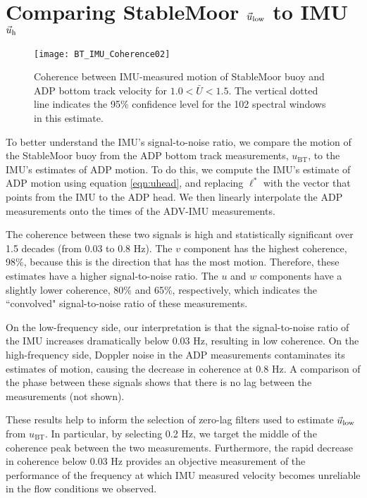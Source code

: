\section{Comparing StableMoor $\vec{u}_\mathrm{low}$ to IMU $\vec{u}_\mathrm{h}$}
\label{apdx:ulow}

\def\ubt{\ensuremath{u_\mathrm{BT}}}

\begin{figure}[t]
  \centering
  \texttt{[image: BT\_IMU\_Coherence02]}
  \caption{Coherence between IMU-measured motion of StableMoor buoy and ADP bottom track velocity for $1.0<\bar{U}<1.5$. The vertical dotted line indicates the 95\% confidence level for the 102 spectral windows in this estimate.}
  \label{fig:SM_coh}
\end{figure}
To better understand the IMU's signal-to-noise ratio, we compare the motion of the StableMoor buoy from the ADP bottom track measurements, $\ubt$, to the IMU's estimates of ADP motion. To do this, we compute the IMU's estimate of ADP motion using equation \eqref{eqn:uhead}, and replacing $\ell^{*}$ with the vector that points from the IMU to the ADP head. We then linearly interpolate the ADP measurements onto the times of the ADV-IMU measurements.

The coherence between these two signals is high and statistically significant over 1.5 decades (from 0.03 to 0.8 Hz). The $v$ component has the highest coherence, 98\%, because this is the direction that has the most motion. Therefore, these estimates have a higher signal-to-noise ratio.  The $u$ and $w$ components have a slightly lower coherence, 80\% and 65\%, respectively, which indicates the ``convolved" signal-to-noise ratio of these measurements.

On the low-frequency side, our interpretation is that the signal-to-noise ratio of the IMU increases dramatically below 0.03 Hz, resulting in low coherence. On the high-frequency side, Doppler noise in the ADP measurements contaminates its estimates of motion, causing the decrease in coherence at 0.8 Hz. A comparison of the phase between these signals shows that there is no lag between the measurements (not shown).

These results help to inform the selection of zero-lag filters used to estimate $\vec{u}_\mathrm{low}$ from $\ubt$. In particular, by selecting 0.2 Hz, we target the middle of the coherence peak between the two measurements. Furthermore, the rapid decrease in coherence below 0.03 Hz provides an objective measurement of the performance of the frequency at which IMU measured velocity becomes unreliable in the flow conditions we observed. 



